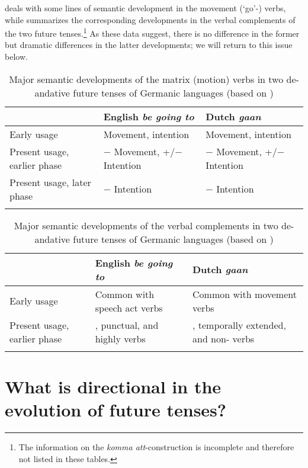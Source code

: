 \documentclass[output=paper]{langsci/langscibook}
\begin{document}
 deals with some lines of semantic development in the movement (‘go’-) verbs, while  summarizes the corresponding developments in the verbal complements of the two future tenses.\footnote{The information on the  \textit{komma att}-construction is incomplete and therefore not listed in these tables.} As these data suggest, there is no difference in the former but dramatic differences in the latter developments; we will return to this issue below.



\begin{table}


\begin{tabularx}{\textwidth}{Qll} 
\lsptoprule
& English \textit{be going to} & Dutch \textit{gaan}\\
\midrule
Early usage & Movement, intention & Movement, intention\\
Present usage, earlier phase & − Movement, +/− Intention & − Movement, +/− Intention\\
Present usage, later phase & − Intention & − Intention\\
\lspbottomrule
\end{tabularx}
\caption{Major semantic developments of the matrix (motion) verbs in two de-andative future tenses of Germanic languages (based on \citealt[116--123]{Hilpert2008})}
\label{tab:heine:4}
\end{table}


\begin{table}
\caption{Major semantic developments of the verbal complements in two de-andative future tenses of Germanic languages (based on \citealt[116--123]{Hilpert2008})}
\label{tab:heine:5}
\begin{tabularx}{\textwidth}{QQQ} 
\lsptoprule
& English \textit{be going to} & Dutch \textit{gaan}\\
\midrule
Early usage & Common with  speech act verbs & Common with  movement verbs\\
Present usage, earlier phase & , punctual, and highly  verbs & , temporally extended, and non- verbs\\
\lspbottomrule
\end{tabularx}
\end{table}

\section{What is directional in the evolution of future tenses?}\label{sec:heine:4}
\end{document}
